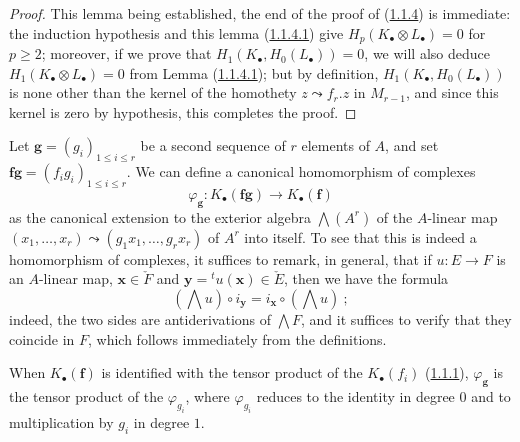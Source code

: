 \begin{proof}
This lemma being established, the end of the proof of
(\hyperref[III.1.1.4]{1.1.4}) is immediate: the induction hypothesis and
this lemma (\hyperref[III.1.1.4.1]{1.1.4.1}) give
$H_p(K_\bullet\otimes L_\bullet)=0$ for $p\geq2$; moreover, if we prove that
$H_1(K_\bullet,H_0(L_\bullet))=0$, we will also deduce
$H_1(K_\bullet\otimes L_\bullet)=0$ from Lemma
(\hyperref[III.1.1.4.1]{1.1.4.1}); but by definition,
$H_1(K_\bullet,H_0(L_\bullet))$ is none other than the kernel of the
homothety $z\leadsto f_r.z$ in $M_{r-1}$, and since this kernel is zero by
hypothesis, this completes the proof.
\end{proof}

\begin{env}[1.1.5]
\label{III.1.1.5}
Let $\mathbf g=(g_i)_{1\leq i\leq r}$ be a second sequence of $r$ elements of
$A$, and set $\mathbf f\mathbf g=(f_ig_i)_{1\leq i\leq r}$. We can define
a canonical homomorphism of complexes
\begin{equation}
\label{III.1.1.5.1}
\tag{1.1.5.1}
\varphi_{\mathbf g}:K_\bullet(\mathbf f\mathbf g)\longrightarrow
K_\bullet(\mathbf f)
\end{equation}
as the canonical extension to the exterior algebra $\bigwedge(A^r)$ of
the $A$-linear map
$(x_1,\ldots,x_r)\leadsto(g_1x_1,\ldots,g_rx_r)$ of $A^r$ into itself. To
see that this is indeed a homomorphism of complexes, it suffices to remark,
in general, that if $u:E\to F$ is an $A$-linear map,
$\mathbf x\in\check F$ and $\mathbf y={}^tu(\mathbf x)\in\check E$, then we have
the formula
\begin{equation}
\label{III.1.1.5.2}
\tag{1.1.5.2}
(\bigwedge u)\circ i_{\mathbf y}=i_{\mathbf x}\circ(\bigwedge u)~;
\end{equation}
indeed, the two sides are antiderivations of $\bigwedge F$, and it
suffices to verify that they coincide in $F$, which follows immediately from
the definitions.

When $K_\bullet(\mathbf f)$ is identified with the tensor product of the
$K_\bullet(f_i)$ (\hyperref[III.1.1.1]{1.1.1}), $\varphi_{\mathbf g}$ is
the tensor product of the $\varphi_{g_i}$, where $\varphi_{g_i}$ reduces to
the identity in degree $0$ and to multiplication by $g_i$ in degree $1$.
\end{env}

